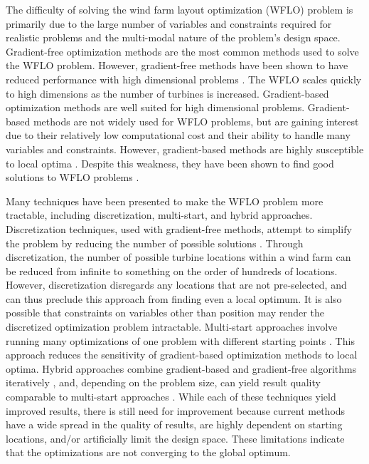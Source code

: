 \documentclass[a4paper]{jpconf}
\begin{document}
The difficulty of solving the wind farm layout optimization (WFLO) problem is primarily due to the large number of variables and constraints required for realistic problems and the multi-modal nature of the problem's design space. Gradient-free optimization methods are the most common methods used to solve the WFLO problem. However, gradient-free methods have been shown to have reduced performance with high dimensional problems \cite{rios2013-grad-free-comparison}. The WFLO scales quickly to high dimensions as the number of turbines is increased. Gradient-based optimization methods are well suited for high dimensional problems. Gradient-based methods are not widely used for WFLO problems, but are gaining interest due to their relatively low computational cost and their ability to handle many variables and constraints. However, gradient-based methods are highly susceptible to local optima \cite{acero2014}. Despite this weakness, they have been shown to find good solutions to WFLO problems \cite{fleming2015, guirguis2016, gebraad2017-Maximization-Annual}.  

Many techniques have been presented to make the WFLO problem more tractable, including discretization, multi-start, and hybrid approaches. Discretization techniques, used with gradient-free methods, attempt to simplify the problem by reducing the number of possible solutions \cite{mosetti1994, grady2005}. Through discretization, the number of possible turbine locations within a wind farm can be reduced from infinite to something on the order of hundreds of locations. However, discretization disregards any locations that are not pre-selected, and can thus preclude this approach from finding even a local optimum. It is also possible that constraints on variables other than position may render the discretized optimization problem intractable. Multi-start approaches involve running many optimizations of one problem with different starting points \cite{gonzalez2014}. This approach reduces the sensitivity of gradient-based optimization methods to local optima. Hybrid approaches combine gradient-based and gradient-free algorithms iteratively \cite{rethore2014,graf2016, mittal2017}, 
%
and, depending on the problem size, can yield result quality comparable to multi-start approaches \cite{rethore2014}. While each of these techniques yield improved results, there is still need for improvement because current methods have a wide spread in the quality of results, are highly dependent on starting locations, and/or artificially limit the design space. These limitations indicate that the optimizations are not converging to the global optimum.
\end{document}
